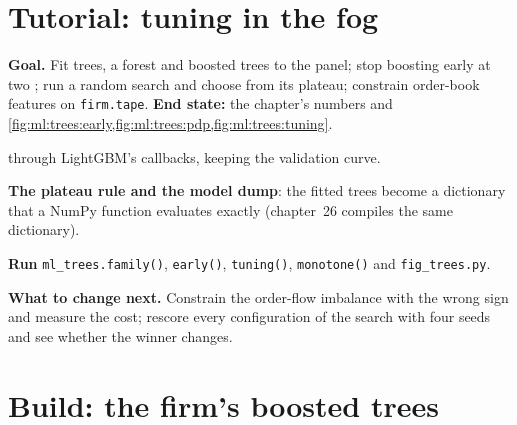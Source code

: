 \section{Tutorial: tuning in the fog}\label{tut:ml:trees-and-boosting:tut}

\begin{tutorial}
\textbf{Goal.} Fit trees, a forest and boosted trees to the panel; stop boosting early at two ; run a
random search and choose from its plateau; constrain order-book features on \texttt{firm.tape}. \textbf{End state:}
the chapter's numbers and \cref{fig:ml:trees:early,fig:ml:trees:pdp,fig:ml:trees:tuning}.
\begin{tutsteps}
\item \textbf{} through LightGBM's callbacks, keeping the validation curve.
\label{lst:ml:trees:early}
\item \textbf{The plateau rule and the model dump}: the fitted trees become a dictionary that a NumPy function
evaluates exactly (chapter~26 compiles the same dictionary).
\label{lst:ml:trees:dump}
\item \textbf{Run} \texttt{ml\_trees.family()}, \texttt{early()}, \texttt{tuning()}, \texttt{monotone()} and
\texttt{fig\_trees.py}.
\end{tutsteps}
\textbf{What to change next.} Constrain the order-flow imbalance with the wrong sign and measure the cost; rescore every
configuration of the search with four seeds and see whether the winner changes.
\end{tutorial}

\section{Build: the firm's boosted trees}\label{bld:ml:trees-and-boosting:gbdt}

